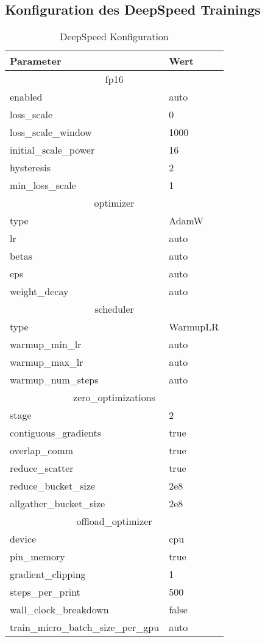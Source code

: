 \subsection{Konfiguration des DeepSpeed Trainings}
\begin{table}
    \centering
    \begin{tabular}{ll}
        \toprule
        \textbf{Parameter}&\textbf{Wert}\\
        \midrule
        \multicolumn{2}{c}{fp16}\\
        enabled&auto\\
        loss\_scale&0\\
        loss\_scale\_window&1000\\
        initial\_scale\_power&16\\
        hysteresis&2\\
        min\_loss\_scale&1\\
        \midrule
        \multicolumn{2}{c}{optimizer}\\
        type&AdamW\\
        lr&auto\\
        betas&auto\\
        eps&auto\\
        weight\_decay&auto\\
        \midrule
        \multicolumn{2}{c}{scheduler}\\
        type&WarmupLR\\
        warmup\_min\_lr&auto\\
        warmup\_max\_lr&auto\\
        warmup\_num\_steps&auto\\
        \midrule
        \multicolumn{2}{c}{zero\_optimizations}\\
        stage&2\\
        contiguous\_gradients&true\\
        overlap\_comm&true\\
        reduce\_scatter&true\\
        reduce\_bucket\_size&2e8\\
        allgather\_bucket\_size&2e8\\
        \midrule
        \multicolumn{2}{c}{offload\_optimizer}\\
        device&cpu\\
        pin\_memory&true\\
        \midrule
        gradient\_clipping&1\\
        steps\_per\_print&500\\
        wall\_clock\_breakdown&false\\
        train\_micro\_batch\_size\_per\_gpu&auto\\
    \end{tabular}
    \caption{DeepSpeed Konfiguration}\label{tab:deepspeed-config}
\end{table}

